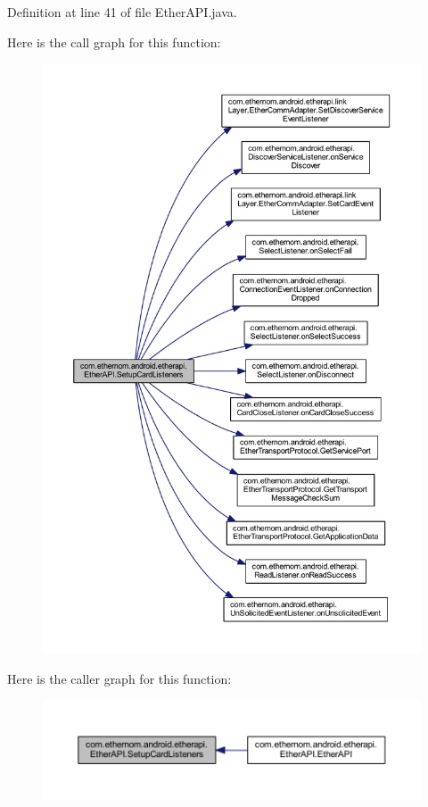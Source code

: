 Definition at line 41 of file Ether\+A\+P\+I.\+java.

Here is the call graph for this function\+:
\nopagebreak
\begin{figure}[H]
\begin{center}
\leavevmode
\includegraphics[width=350pt]{classcom_1_1ethernom_1_1android_1_1etherapi_1_1_ether_a_p_i_a9785ed6dbf7ce2f95bc22f8aa9908392_cgraph}
\end{center}
\end{figure}
Here is the caller graph for this function\+:\nopagebreak
\begin{figure}[H]
\begin{center}
\leavevmode
\includegraphics[width=350pt]{classcom_1_1ethernom_1_1android_1_1etherapi_1_1_ether_a_p_i_a9785ed6dbf7ce2f95bc22f8aa9908392_icgraph}
\end{center}
\end{figure}
